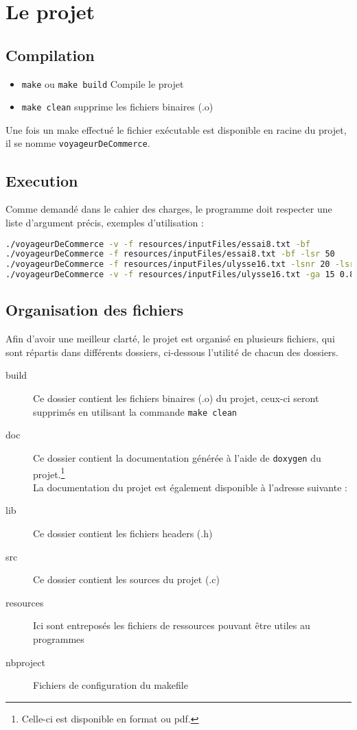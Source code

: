 \documentclass[a4paper, 11pt]{article}
\begin{document}
	\maketitle
	\section{Le projet}
	\subsection{Compilation}
	\begin{itemize}
		\item \texttt{make} ou \texttt{make build} Compile le projet
		\item \texttt{make clean} supprime les fichiers binaires (.o)
	\end{itemize}
	Une fois un make effectué le fichier exécutable est disponible en racine du projet, il se nomme \texttt{voyageurDeCommerce}. 	
	\subsection{Execution}
	Comme demandé dans le cahier des charges, le programme doit respecter une liste d'argument précis, exemples d'utilisation :
	\begin{lstlisting}[language=sh, basicstyle=\scriptsize\ttfamily, caption=Exemple d'execution du programme]
./voyageurDeCommerce -v -f resources/inputFiles/essai8.txt -bf
./voyageurDeCommerce -f resources/inputFiles/essai8.txt -bf -lsr 50
./voyageurDeCommerce -f resources/inputFiles/ulysse16.txt -lsnr 20 -lsr 50
./voyageurDeCommerce -v -f resources/inputFiles/ulysse16.txt -ga 15 0.8
	\end{lstlisting}
	\subsection{Organisation des fichiers}
	Afin d'avoir une meilleur clarté, le projet est organisé en plusieurs fichiers, qui sont répartis dans différents dossiers, ci-dessous l'utilité de chacun
	des dossiers.

	\begin{description}
		\item[{build}] Ce dossier contient les fichiers binaires (.o) du projet, ceux-ci seront supprimés en utilisant la commande
			\texttt{make clean} 
		\item[{doc}] Ce dossier contient la documentation générée à l'aide de \texttt{doxygen} du projet.\footnote{Celle-ci est disponible en format  ou
			pdf.} \\La documentation du projet est également disponible à l'adresse suivante : \\ 
		\item[{lib}] Ce dossier contient les fichiers headers (.h)
		\item[{src}] Ce dossier contient les sources du projet (.c) 
		\item[{resources}] Ici sont entreposés les fichiers de ressources pouvant être utiles au programmes 
		\item[nbproject] Fichiers de configuration du makefile
	\end{description}
\end{document}
